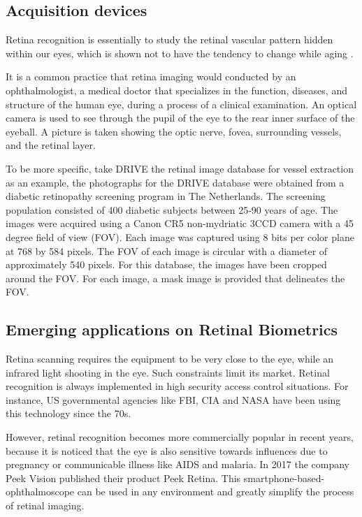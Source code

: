 \documentclass[a4paper,11pt]{article}
\theoremstyle{plain} %
\begin{document}
\subsection{Acquisition devices}
Retina recognition is essentially to study the retinal vascular pattern hidden within our eyes, which is shown not to have the tendency to change while aging \cite{fatima2013feature}. 

It is a common practice that retina imaging would conducted by an ophthalmologist, a medical doctor that specializes in the function, diseases, and structure of the human eye, during a process of a clinical examination. An optical camera is used to see through the pupil of the eye to the rear inner surface of the eyeball. A picture is taken showing the optic nerve, fovea, surrounding vessels, and the retinal layer.

To be more specific, take DRIVE the retinal image database for vessel extraction as an example, the photographs for the DRIVE database were obtained from a diabetic retinopathy screening program in The Netherlands. The screening population consisted of 400 diabetic subjects between 25-90 years of age. The images were acquired using a Canon CR5 non-mydriatic 3CCD camera with a 45 degree field of view (FOV). Each image was captured using 8 bits per color plane at 768 by 584 pixels. The FOV of each image is circular with a diameter of approximately 540 pixels. For this database, the images have been cropped around the FOV. For each image, a mask image is provided that delineates the FOV.


\subsection{Emerging applications on Retinal Biometrics}
Retina scanning requires the equipment to be very close to the eye, while an infrared light shooting in the eye. Such constraints limit its market. Retinal recognition is always implemented in high security access control situations. For instance, US governmental agencies like FBI, CIA and NASA have been using this technology since the 70s.

However, retinal recognition becomes more commercially popular in recent years, because it is noticed that the  eye is also sensitive towards  influences due to pregnancy or communicable illness like AIDS and malaria. In 2017 the company Peek Vision published their product Peek Retina. This smartphone-based-ophthalmoscope can be used in any environment and greatly simplify the process of retinal imaging. 
\end{document}
